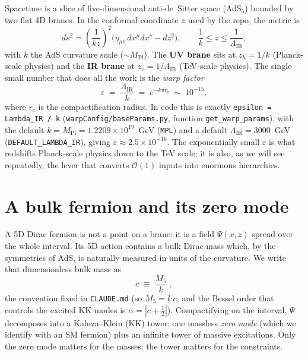 \documentclass[11pt]{article}
\newcommand{\LIR}{\Lambda_{\mathrm{IR}}}
\newcommand{\half}{\tfrac{1}{2}}
\newcommand{\eps}{\varepsilon}
\newcommand{\Mpl}{M_{\mathrm{Pl}}}
\newcommand{\code}[1]{\texttt{#1}}
\theoremstyle{definition}
\begin{document}
Spacetime is a slice of five-dimensional anti-de~Sitter space (AdS$_5$) bounded by
two flat 4D branes. In the conformal coordinate $z$ used by the repo, the metric is
\begin{equation}
ds^2 = \left(\frac{1}{k z}\right)^2\!\big(\eta_{\mu\nu}\,dx^\mu dx^\nu - dz^2\big),
\qquad \frac{1}{k}\le z\le \frac{1}{\LIR},
\end{equation}
with $k$ the AdS curvature scale ($\sim\Mpl$). The \textbf{UV brane} sits at
$z_h=1/k$ (Planck-scale physics) and the \textbf{IR brane} at $z_v=1/\LIR$
(TeV-scale physics). The single small number that does all the work is the
\emph{warp factor}
\begin{equation}
\eps \;=\; \frac{\LIR}{k} \;=\; e^{-k\pi r_c}\;\sim\;10^{-15},
\label{eq:epsdef}
\end{equation}
where $r_c$ is the compactification radius. In code this is exactly
\code{epsilon = Lambda\_IR / k} (\code{warpConfig/baseParams.py}, function
\code{get\_warp\_params}), with the default $k=\Mpl=1.2209\times10^{19}$~GeV
(\code{MPL}) and a default $\LIR=3000$~GeV (\code{DEFAULT\_LAMBDA\_IR}), giving
$\eps\approx 2.5\times10^{-16}$. The exponentially small $\eps$ is what redshifts
Planck-scale physics down to the TeV scale; it is also, as we will see repeatedly,
the lever that converts $\mathcal{O}(1)$ inputs into enormous hierarchies.

\section{A bulk fermion and its zero mode}
\label{sec:zeromode}

A 5D Dirac fermion is not a point on a brane: it is a field $\Psi(x,z)$ spread
over the whole interval. Its 5D action contains a bulk Dirac mass which, by the
symmetries of AdS, is naturally measured in units of the curvature. We write that
dimensionless bulk mass as
\begin{equation}
\boxed{\;c \;\equiv\; \frac{M_5}{k}\;,\;}
\label{eq:cdef}
\end{equation}
the convention fixed in \code{CLAUDE.md} (so $M_5 = k\,c$, and the Bessel order
that controls the excited KK modes is $\alpha=|c+\half|$). Compactifying on the
interval, $\Psi$ decomposes into a Kaluza--Klein (KK) tower: one massless
\emph{zero mode} (which we identify with an SM fermion) plus an infinite tower of
massive excitations. Only the zero mode matters for the masses; the tower matters
for the constraints.
\end{document}
